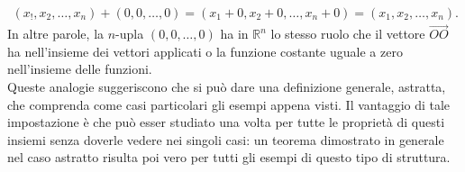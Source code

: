 \documentclass{book}
\theoremstyle{definition}
\theoremstyle{plain}
\begin{document}
\begin{eqnarray}
  \label{eq:spaziovect3}
  (x_!,x_2,\dots, x_n)+(0,0,\dots,0)=(x_1+0,x_2+0,\dots,x_n+0)=(x_1,x_2,\dots,x_n).
\end{eqnarray}
In altre parole, la $n$-upla $(0,0,\dots,0)$ ha in $\mathds{R}^n$ lo stesso ruolo che il vettore $\vec{OO}$ ha nell'insieme dei vettori applicati o la funzione costante uguale a zero nell'insieme delle funzioni.\\
Queste analogie suggeriscono che si può dare una definizione generale, astratta, che comprenda come casi particolari gli esempi appena visti. Il vantaggio di tale impostazione è che può esser studiato una volta per tutte le proprietà di questi insiemi senza doverle vedere nei singoli casi: un teorema dimostrato in generale nel caso astratto risulta poi vero per tutti gli esempi di questo tipo di struttura.
\end{document}
